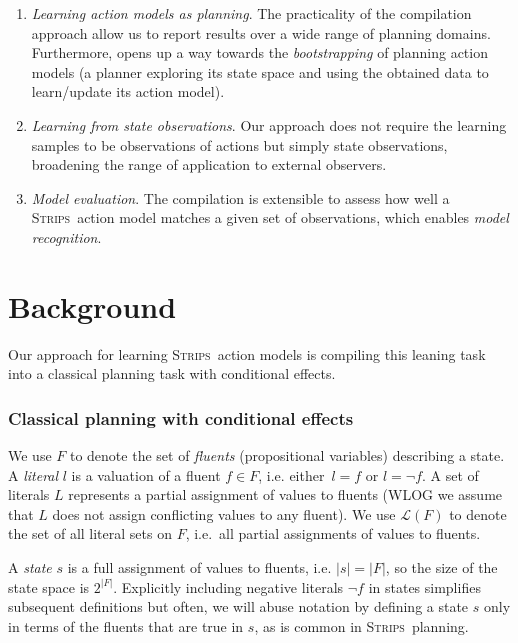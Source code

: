 \documentclass{article}
\newcommand{\strips}{\textsc{Strips}}     %
\begin{document}
\begin{enumerate}
\item {\em Learning action models as planning}.  The practicality of the compilation approach allow us to report results over a wide range of planning domains. Furthermore, opens up a way towards the {\em bootstrapping} of planning action models (a planner exploring its state space and using the obtained data to learn/update its action model).
\item {\em Learning from state observations}.  Our approach does not require the learning samples to be observations of actions but simply state observations, broadening the range of application to external observers.
\item {\em Model evaluation}. The compilation is extensible to assess how well a \strips\ action model matches a given set of observations, which enables {\em model recognition}. 
\end{enumerate}


\section{Background}
Our approach for learning \strips\ action models is compiling this leaning task into a classical planning task with conditional effects.

\subsubsection{Classical planning with conditional effects}
We use $F$ to denote the set of {\em fluents} (propositional variables) describing a state. A {\em literal} $l$ is a valuation of a fluent $f\in F$, i.e. either~$l=f$ or $l=\neg f$. A set of literals $L$ represents a partial assignment of values to fluents (WLOG we assume that $L$ does not assign conflicting values to any fluent). We use $\mathcal{L}(F)$ to denote the set of all literal sets on $F$, i.e.~all partial assignments of values to fluents.

A {\em state} $s$ is a full assignment of values to fluents, i.e. $|s|=|F|$, so the size of the state space is $2^{|F|}$. Explicitly including negative literals $\neg f$ in states simplifies subsequent definitions but often, we will abuse notation by defining a state $s$ only in terms of the fluents that are true in $s$, as is common in \strips\ planning.
\end{document}
